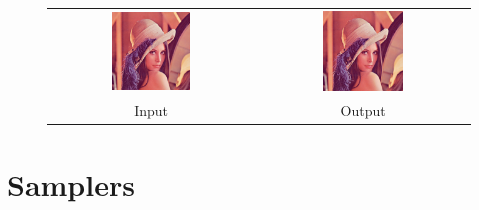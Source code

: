 \documentclass{beamer}
\begin{document}
\begin{frame}

\end{frame}

\begin{frame}

\end{frame}

\begin{frame}
\begin{figure}\centering
\begin{tabular}{cc}
\includegraphics[width=0.4\textwidth]{examples/reduce/lena} &
\includegraphics[width=0.4\textwidth]{examples/reduce/output_example1} \\
Input & Output
\end{tabular}
\end{figure}
\end{frame}


\section{Samplers} %
\end{document}

